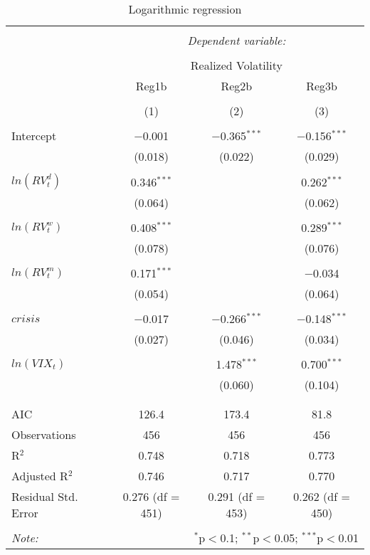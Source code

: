 
\begin{table}[!htbp] \centering 
  \caption{Logarithmic regression} 
  \label{} 
\begin{tabular}{@{\extracolsep{5pt}}lccc} 
\\[-1.8ex]\hline 
\hline \\[-1.8ex] 
 & \multicolumn{3}{c}{\textit{Dependent variable:}} \\ 
\cline{2-4} 
\\[-1.8ex] & \multicolumn{3}{c}{Realized Volatility} \\ 
 & Reg1b & Reg2b & Reg3b \\ 
\\[-1.8ex] & (1) & (2) & (3)\\ 
\hline \\[-1.8ex] 
 Intercept & $-$0.001 & $-$0.365$^{***}$ & $-$0.156$^{***}$ \\ 
  & (0.018) & (0.022) & (0.029) \\ 
  & & & \\ 
 $ln(RV^{d}_{t})$ & 0.346$^{***}$ &  & 0.262$^{***}$ \\ 
  & (0.064) &  & (0.062) \\ 
  & & & \\ 
 $ln(RV^{w}_{t})$ & 0.408$^{***}$ &  & 0.289$^{***}$ \\ 
  & (0.078) &  & (0.076) \\ 
  & & & \\ 
 $ ln(RV^{m}_{t})$ & 0.171$^{***}$ &  & $-$0.034 \\ 
  & (0.054) &  & (0.064) \\ 
  & & & \\ 
 $crisis$ & $-$0.017 & $-$0.266$^{***}$ & $-$0.148$^{***}$ \\ 
  & (0.027) & (0.046) & (0.034) \\ 
  & & & \\ 
 $ln(VIX_{t})$ &  & 1.478$^{***}$ & 0.700$^{***}$ \\ 
  &  & (0.060) & (0.104) \\ 
  & & & \\ 
\hline \\[-1.8ex] 
AIC & 126.4 & 173.4 & 81.8 \\ 
Observations & 456 & 456 & 456 \\ 
R$^{2}$ & 0.748 & 0.718 & 0.773 \\ 
Adjusted R$^{2}$ & 0.746 & 0.717 & 0.770 \\ 
Residual Std. Error & 0.276 (df = 451) & 0.291 (df = 453) & 0.262 (df = 450) \\ 
\hline 
\hline \\[-1.8ex] 
\textit{Note:}  & \multicolumn{3}{r}{$^{*}$p$<$0.1; $^{**}$p$<$0.05; $^{***}$p$<$0.01} \\ 
\end{tabular} 
\end{table} 
